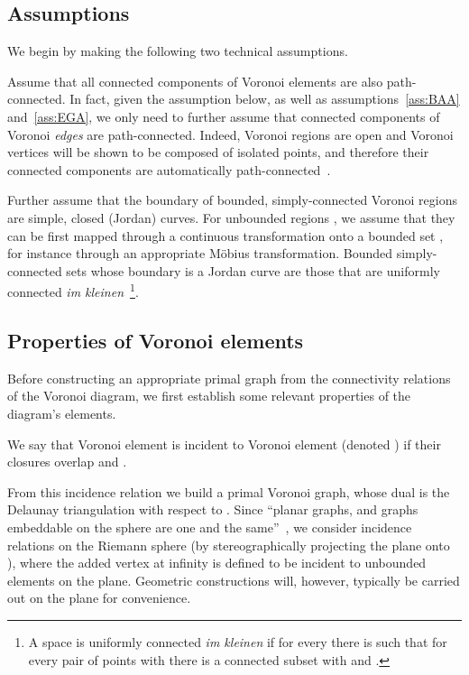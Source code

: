 \documentclass[11pt]{article}
\begin{document}
\subsection{Assumptions}\label{sec:assumptions}

We begin by making the following two technical assumptions. 


\vspace*{0.1in}
Assume that all connected components of Voronoi elements are also path-connected. 
In fact, given the assumption below, as well as assumptions~\ref{ass:BAA} and~\ref{ass:EGA}, 
	we only need to further assume that connected components of Voronoi \emph{edges} are path-connected. 
Indeed, Voronoi regions are open and Voronoi vertices will be shown to be composed of isolated points, 
	and therefore their connected components are automatically path-connected~\cite[p.\ 158]{munkres2000topology}.


\vspace*{0.1in}
Further assume that the boundary of bounded, simply-connected Voronoi regions are simple, closed (Jordan) curves. 
For unbounded regions , we assume that they can be first mapped 
	through a continuous transformation 
	onto a bounded set , for instance through an appropriate M{\"o}bius transformation. Bounded simply-connected sets whose boundary is a Jordan curve 
	are those that are uniformly connected \emph{im kleinen}~\cite{Moore1918}\footnote{
	A space  is uniformly connected \emph{im kleinen} if for every  there is  
	such that for every pair of points  with 
		there is a connected subset  with  and . 
	}.





\subsection{Properties of Voronoi elements}\label{sec:properties}


Before constructing an appropriate primal graph from the connectivity relations of the Voronoi diagram, 
	we first establish some relevant properties of the diagram's elements. 

We say that Voronoi element  is incident to Voronoi element  
	(denoted )
	if their closures overlap  
	and . 

From this incidence relation we build a primal Voronoi graph, whose dual is the Delaunay triangulation with respect to . 
Since ``planar graphs, and graphs embeddable on the sphere are one and the same''~\cite[p.\ 247]{bondy2008graph}, 
	we consider incidence relations on the Riemann sphere (by stereographically projecting the plane onto ), 
	where the added vertex at infinity is defined to be incident to unbounded elements on the plane. 
Geometric constructions will, however, typically be carried out on the plane for convenience. 
\end{document}
